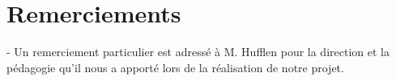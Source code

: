 \documentclass[a4paper,12pt]{report}
\begin{document}
    \newpage
    \section*{Remerciements}
    - Un remerciement particulier est adressé à M. Hufflen pour la direction et la pédagogie qu'il nous a apporté lors de la réalisation de notre projet.

    \newpage
    \tableofcontents

    
    
    
    

    \printglossaries
    \newpage

\end{document}
